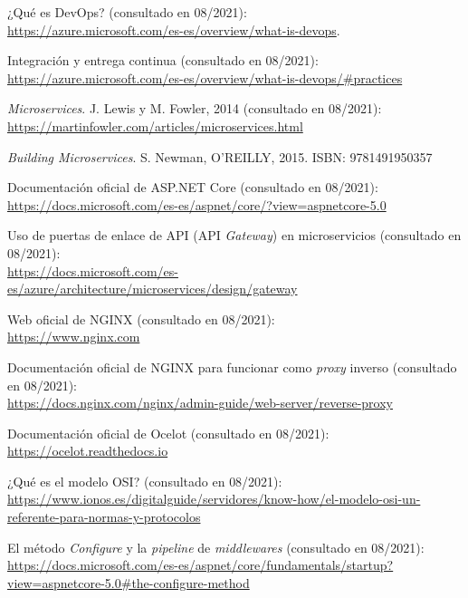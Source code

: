 \documentclass[11pt,spanish,listoffigures]{tfgetsinf}
\begin{document}
\begin{thebibliography}{10}

¿Qué es DevOps? (consultado en 08/2021):\\
\url{https://azure.microsoft.com/es-es/overview/what-is-devops}.

Integración y entrega continua (consultado en 08/2021):\\
\url{https://azure.microsoft.com/es-es/overview/what-is-devops/#practices}

\newblock \emph{Microservices}.
\newblock J. Lewis y M. Fowler, 2014 (consultado en 08/2021):\\
\url{https://martinfowler.com/articles/microservices.html}

\newblock \emph{Building Microservices}.
\newblock S. Newman, O'REILLY, 2015.
\newblock ISBN: 9781491950357

Documentación oficial de ASP.NET Core (consultado en 08/2021):\\
\url{https://docs.microsoft.com/es-es/aspnet/core/?view=aspnetcore-5.0}

Uso de puertas de enlace de API (API \emph{Gateway}) en microservicios (consultado en 08/2021):\\
\url{https://docs.microsoft.com/es-es/azure/architecture/microservices/design/gateway}

Web oficial de NGINX (consultado en 08/2021):\\
\url{https://www.nginx.com}

Documentación oficial de NGINX para funcionar como \emph{proxy} inverso (consultado en 08/2021):\\
\url{https://docs.nginx.com/nginx/admin-guide/web-server/reverse-proxy}

Documentación oficial de Ocelot (consultado en 08/2021):\\
\url{https://ocelot.readthedocs.io}

¿Qué es el modelo OSI? (consultado en 08/2021):\\
\url{https://www.ionos.es/digitalguide/servidores/know-how/el-modelo-osi-un-referente-para-normas-y-protocolos}

El método \emph{Configure} y la \emph{pipeline} de \emph{middlewares} (consultado en 08/2021):\\
\url{https://docs.microsoft.com/es-es/aspnet/core/fundamentals/startup?view=aspnetcore-5.0#the-configure-method}


\end{thebibliography}
\end{document}
